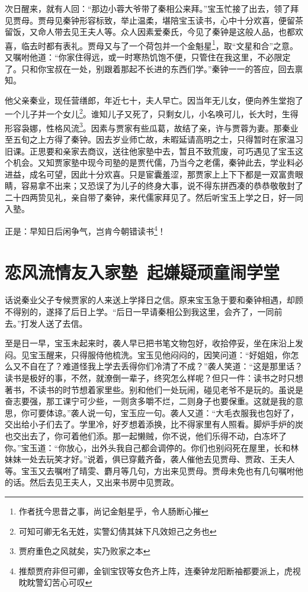 \documentclass[12pt,oneside]{book}
\begin{document}
次日醒来，就有人回：“那边小蓉大爷带了秦相公来拜。”宝玉忙接了出去，领了拜见贾母。贾母见秦钟形容标致，举止温柔，堪陪宝玉读书，心中十分欢喜，便留茶留饭，又命人带去见王夫人等。众人因素爱秦氏，今见了秦钟是这般人品，也都欢喜，临去时都有表礼。贾母又与了一个荷包并一个金魁星\footnote{作者抚今思昔之事，尚记金魁星乎，令人肠断心摧}，取“文星和合”之意。又嘱咐他道：“你家住得远，或一时寒热饥饱不便，只管住在我这里，不必限定了。只和你宝叔在一处，别跟着那起不长进的东西们学。”秦钟一一的答应，回去禀知。

他父亲秦业，现任营缮郎，年近七十，夫人早亡。因当年无儿女，便向养生堂抱了一个儿子并一个女儿\footnote{可知可卿无名无姓，实警幻倩其妹下凡效妲己之务也}。谁知儿子又死了，只剩女儿，小名唤可儿，长大时，生得形容袅娜，性格风流\footnote{贾府重色之风就矣，实乃败家之本}。因素与贾家有些瓜葛，故结了亲，许与贾蓉为妻。那秦业至五旬之上方得了秦钟。因去岁业师亡故，未暇延请高明之士，只得暂时在家温习旧课。正思要和亲家去商议，送往他家塾中去，暂且不致荒废，可巧遇见了宝玉这个机会。又知贾家塾中现今司塾的是贾代儒，乃当今之老儒，秦钟此去，学业料必进益，成名可望，因此十分欢喜。只是宦囊羞涩，那贾家上上下下都是一双富贵眼睛，容易拿不出来；又恐误了为儿子的终身大事，说不得东拼西凑的恭恭敬敬封了二十四两贽见礼，亲自带了秦钟，来代儒家拜见了。然后听宝玉上学之日，好一同入塾。

正是：早知日后闲争气，岂肯今朝错读书\footnote{推颓贾府非但可卿，金钏宝钗等女色齐上阵，连秦钟龙阳断袖都要派上，虎视眈眈警幻苦心可叹}！
 
 
 \chapter{恋风流情友入家塾~起嫌疑顽童闹学堂}
话说秦业父子专候贾家的人来送上学择日之信。原来宝玉急于要和秦钟相遇，却顾不得别的，遂择了后日上学。“后日一早请秦相公到我这里，会齐了，一同前去。”打发人送了去信。

至是日一早，宝玉未起来时，袭人早已把书笔文物包好，收拾停妥，坐在床沿上发闷。见宝玉醒来，只得服侍他梳洗。宝玉见他闷闷的，因笑问道：“好姐姐，你怎么又不自在了？难道怪我上学去丢得你们冷清了不成？”袭人笑道：“这是那里话？读书是极好的事，不然，就潦倒一辈子，终究怎么样呢？但只一件：读书之时只想著书，不读书的时节想着家里些。别和他们一处玩闹，碰见老爷不是玩的。虽说是奋志要强，那工课宁可少些，一则贪多嚼不烂，二则身子也要保重。这就是我的意思，你可要体谅。”袭人说一句，宝玉应一句。袭人又道：“大毛衣服我也包好了，交出给小子们去了。学里冷，好歹想着添换，比不得家里有人照看。脚炉手炉的炭也交出去了，你可着他们添。那一起懒贼，你不说，他们乐得不动，白冻坏了你。”宝玉道：“你放心，出外头我自己都会调停的。你们也别闷死在屋里，长和林妹妹一处去玩笑才好。”说着，俱已穿戴齐备，袭人催他去见贾母、贾政、王夫人等。宝玉又去嘱咐了晴雯、麝月等几句，方出来见贾母。贾母未免也有几句嘱咐他的话。然后去见王夫人，又出来书房中见贾政。
\end{document}
